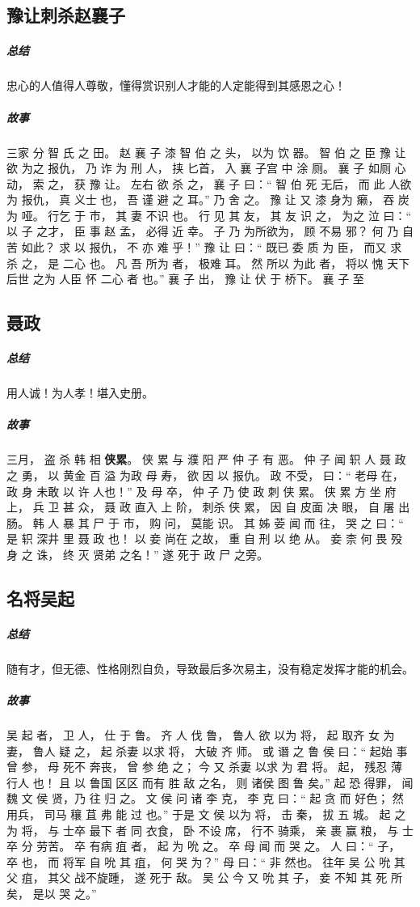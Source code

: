 \documentclass[UTF8,a4paper,8pt]{ctexbook}
\begin{document}
		\subsection{豫让刺杀赵襄子}
			\subparagraph{总结}忠心的人值得人尊敬，懂得赏识别人才能的人定能得到其感恩之心！
			
			\subparagraph{故事}
				三家 分 智 氏 之 田。 赵 襄 子 漆 智 伯 之 头， 以为 饮 器。 智 伯 之 臣 豫 让 欲 为之 报仇， 乃 诈 为 刑 人， 挟 匕首， 入 襄 子宫 中 涂 厕。 襄 子 如厕 心动， 索 之， 获 豫 让。 左右 欲 杀 之， 襄 子 曰：“ 智 伯 死 无后， 而 此 人欲 为 报仇， 真 义士 也， 吾 谨 避 之 耳。” 乃 舍 之。 豫 让 又 漆 身为 癞， 吞 炭 为 哑。 行乞 于 市， 其 妻 不识 也。 行 见 其 友， 其 友 识 之， 为之 泣 曰：“ 以 子 之才， 臣 事 赵 孟， 必得 近 幸。 子 乃 为所欲为， 顾 不易 邪？ 何 乃 自 苦 如此？ 求 以 报仇， 不 亦 难 乎！” 豫 让 曰：“ 既已 委 质 为 臣， 而又 求 杀 之， 是 二心 也。 凡 吾 所为 者， 极难 耳。 然 所以 为此 者， 将以 愧 天下 后世 之为 人臣 怀 二心 者 也。” 襄 子 出， 豫 让 伏 于 桥下。 襄 子 至 
				
		\subsection{聂政}
			\subparagraph{总结}用人诚！为人孝！堪入史册。
			
			\subparagraph{故事}
				三月， 盗 杀 韩 相 \textbf{侠累}。 侠 累 与 濮 阳 严 仲 子 有 恶。 仲 子 闻 轵 人 聂 政 之 勇， 以 黄金 百 溢 为政 母 寿， 欲 因 以 报仇。 政 不受， 曰：“ 老母 在， 政 身 未敢 以 许 人也！” 及 母 卒， 仲 子 乃 使 政 刺 侠 累。 侠 累 方 坐 府上， 兵 卫 甚 众， 聂 政 直入 上 阶， 刺杀 侠 累， 因 自 皮面 决 眼， 自 屠 出 肠。 韩 人 暴 其 尸 于 市， 购 问， 莫能 识。 其 姊 荌 闻 而 往， 哭 之 曰：“ 是 轵 深井 里 聂 政 也！ 以 妾 尚在 之故， 重 自 刑 以 绝 从。 妾 柰 何 畏 殁 身 之 诛， 终 灭 贤弟 之名！” 遂 死于 政 尸 之旁。
			
						
		\subsection{名将吴起}
			\subparagraph{总结}随有才，但无德、性格刚烈自负，导致最后多次易主，没有稳定发挥才能的机会。
			
			\subparagraph{故事}
				吴 起 者， 卫 人， 仕 于 鲁。 齐 人 伐 鲁， 鲁人 欲 以为 将， 起 取齐 女 为妻， 鲁人 疑 之， 起 杀妻 以求 将， 大破 齐 师。 或 谮 之 鲁 侯 曰：“ 起始 事 曾 参， 母 死不 奔丧， 曾 参 绝 之； 今 又 杀妻 以求 为 君 将。 起， 残忍 薄 行人 也！ 且 以 鲁国 区区 而有 胜 敌 之名， 则 诸侯 图 鲁 矣。” 起 恐 得罪， 闻 魏 文 侯 贤，乃 往 归 之。 文 侯 问 诸 李 克， 李 克 曰：“ 起 贪 而 好色； 然 用兵， 司马 穰 苴 弗 能 过 也。” 于是 文 侯 以为 将， 击 秦， 拔 五 城。 起 之为 将， 与 士卒 最下 者 同 衣食， 卧 不设 席， 行不 骑乘， 亲 裹 赢 粮， 与 士卒 分 劳苦。 卒 有病 疽 者， 起 为 吮 之。 卒 母 闻 而 哭 之。 人 曰：“ 子， 卒 也， 而 将军 自 吮 其 疽， 何 哭 为？” 母 曰：“ 非 然也。 往年 吴 公 吮 其父 疽， 其父 战不旋踵， 遂 死于 敌。 吴 公 今 又 吮 其 子， 妾 不知 其 死 所 矣， 是以 哭 之。”
	
\end{document}
